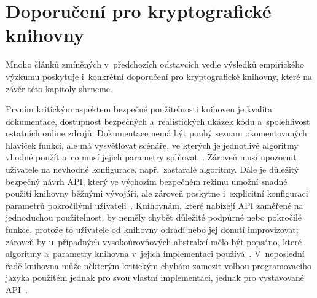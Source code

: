 \section{Doporučení pro kryptografické knihovny}

Mnoho článků zmíněných v~předchozích odstavcích vedle výsledků empirického výzkumu poskytuje i~konkrétní doporučení pro kryptografické knihovny, které na závěr této kapitoly shrneme.

Prvním kritickým aspektem bezpečné použitelnosti knihoven je kvalita dokumentace, dostupnost bezpečných a~realistických ukázek kódu a~spolehlivost ostatních online zdrojů. Dokumentace nemá být pouhý seznam okomentovaných hlaviček funkcí, ale má vysvětlovat scénáře, ve kterých je jednotlivé algoritmy vhodné použít a~co musí jejich parametry splňovat~\cite{rustcryptoapis, comparing2017}. Zároveň musí upozornit uživatele na nevhodné konfigurace, např.\ zastaralé algoritmy. Dále je důležitý bezpečný návrh API, který ve výchozím bezpečném režimu umožní snadné použití knihovny běžnými vývojáři, ale zároveň poskytne i~explicitní konfiguraci parametrů pokročilými uživateli~\cite{fluentcrypto, comparing2017}. Knihovnám, které nabízejí API zaměřené na jednoduchou použitelnost, by neměly chybět důležité podpůrné nebo pokročilé funkce, protože to uživatele od knihovny odradí nebo jej donutí improvizovat; zároveň by u~případných vysokoúrovňových abstrakcí mělo být popsáno, které algoritmy a~parametry knihovna v~jejich implementaci používá~\cite{comparative2023}. V~neposlední řadě knihovna může některým kritickým chybám zamezit volbou programovacího jazyka použitém jednak pro svou vlastní implementaci, jednak pro vystavované API~\cite{comparative2023}.
